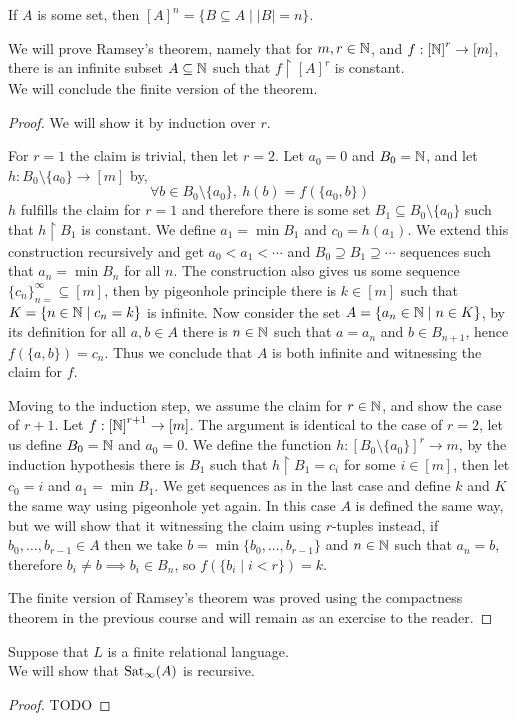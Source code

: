 \question{}
\begin{remark}
	If $A$ is some set, then ${[A]}^n = \{ B \subseteq A \mid |B| = n \}$.
\end{remark}
We will prove Ramsey's theorem,
namely that for $m, r \in \mathbb{N}$, and $f : {[ \mathbb{N} ]}^r \to [m]$, there is an infinite subset $A \subseteq \mathbb{N}$ such that $f \restriction {[ A ]}^r$ is constant. \\
We will conclude the finite version of the theorem.
\begin{proof}
	We will show it by induction over $r$.

	For $r = 1$ the claim is trivial, then let $r = 2$.
	Let $a_0 = 0$ and $B_0 = \mathbb{N}$, and let $h : B_0 \setminus \{ a_0 \} \to [m]$ by,
	\[
		\forall b \in B_0 \setminus \{ a_0 \},\ h(b) = f(\{a_0, b\})
	\]
	$h$ fulfills the claim for $r = 1$ and therefore there is some set $B_1 \subseteq B_0 \setminus \{ a_0 \}$ such that $h \restriction B_1$ is constant.
	We define $a_1 = \min B_1$ and $c_0 = h(a_1)$.
	We extend this construction recursively and get $a_0 < a_1 < \cdots$ and $B_0 \supseteq B_1 \supseteq \cdots$ sequences such that $a_n = \min B_n$ for all $n$.
	The construction also gives us some sequence ${\{ c_n \}}_{n = }^\infty \subseteq [m]$, then by pigeonhole principle there is $k \in [m]$ such that $K = \{ n \in \mathbb{N} \mid c_n = k \}$ is infinite.
	Now consider the set $A = \{ a_n \in \mathbb{N} \mid n \in K \}$, by its definition for all $a, b \in A$ there is $n \in \mathbb{N}$ such that $a = a_n$ and $b \in B_{n + 1}$, hence $f(\{a, b\}) = c_n$.
	Thus we conclude that $A$ is both infinite and witnessing the claim for $f$.

	Moving to the induction step, we assume the claim for $r \in \mathbb{N}$, and show the case of $r + 1$.
	Let $f : {[ \mathbb{N} ]}^{r + 1} \to [m]$.
	The argument is identical to the case of $r = 2$, let us define $B_0 = \mathbb{N}$ and $a_0 = 0$.
	We define the function $h : {[ B_0 \setminus \{ a_0 \} ]}^r \to m$, by the induction hypothesis there is $B_1$ such that $h \restriction B_1 = c_i$ for some $i \in [m]$, then let $c_0 = i$ and $a_1 = \min B_1$.
	We get sequences as in the last case and define $k$ and $K$ the same way using pigeonhole yet again.
	In this case $A$ is defined the same way, but we will show that it witnessing the claim using $r$-tuples instead,
	if $b_0, \ldots, b_{r - 1} \in A$ then we take $b = \min\{ b_0, \ldots, b_{r - 1} \}$ and $n \in \mathbb{N}$ such that $a_n = b$, therefore $b_i \ne b \implies b_i \in B_n$, so $f(\{ b_i \mid i < r \}) = k$.

	The finite version of Ramsey's theorem was proved using the compactness theorem in the previous course and will remain as an exercise to the reader.
\end{proof}

\question{}
Suppose that $L$ is a finite relational language. \\
We will show that $\operatorname{Sat}_{\infty}(A)$ is recursive.
\begin{proof}
	TODO
\end{proof}


